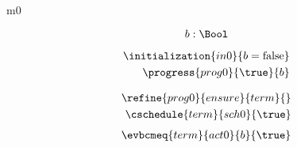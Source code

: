 \documentclass{article}
\begin{document}
	
\begin{machine}{m0}
	
\[
\variable{ b : \Bool }
\]
\begin{description}
\end{description}

\begin{align}
\initialization{in0}{b = \false} \\
\progress{prog0}{\true}{b}
\end{align}

\begin{align}
\refine{prog0}{ensure}{term}{} \\
\weakento{term}{default}{sch0} \\
\cschedule{term}{sch0}{\true} 
\end{align}
\begin{align}
\evbcmeq{term}{act0}{b}{\true}
\end{align}


\end{machine}

\newcommand{\Pcs}{\text{P}}
\end{document}
